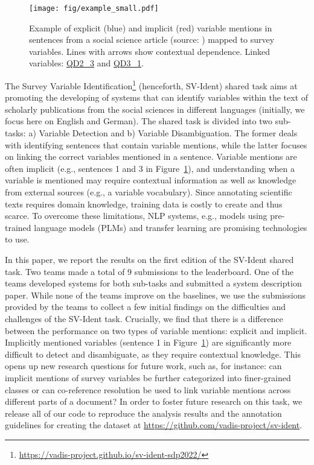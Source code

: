\documentclass[11pt]{article}
\begin{document}
\begin{figure}
    \centering
    \texttt{[image: fig/example\_small.pdf]}
    \caption{Example of {\color[HTML]{0072B2}explicit} ({\color[HTML]{0072B2}blue}) and {\color[HTML]{D35F00}implicit} ({\color[HTML]{D35F00}red}) variable mentions in sentences from a social science article (source:  \citet{MaC885}) mapped to survey variables. Lines with arrows show contextual dependence. Linked variables: \href{https://search.gesis.org/variables/exploredata-ZA5876_Varqd2_3}{QD2\_3} and \href{https://search.gesis.org/variables/exploredata-ZA5876_Varqd3_1}{QD3\_1}.}
    \label{fig:example}
\end{figure}

The Survey Variable Identification\footnote{\url{https://vadis-project.github.io/sv-ident-sdp2022/}} (henceforth, SV-Ident) shared task aims at promoting the developing of systems that can identify variables within the text of scholarly publications from the social sciences in different languages (initially, we focus here on English and German).
The shared task is divided into two sub-tasks: a) Variable Detection and b) Variable Disambiguation.
The former deals with identifying sentences that contain variable mentions, while the latter focuses on linking the correct variables mentioned in a sentence.
Variable mentions are often implicit (e.g., sentences 1 and 3 in Figure~\ref{fig:example}), and understanding when a variable is mentioned may require contextual information as well as knowledge from external sources (e.g., a variable vocabulary).
Since annotating scientific texts requires domain knowledge, training data is costly to create and thus scarce.
To overcome these limitations, NLP systems, e.g., models using pre-trained language models (PLMs) and transfer learning are promising technologies to use.

In this paper, we report the results on the first edition of the SV-Ident shared task.
Two teams made a total of 9 submissions to the leaderboard.
One of the teams developed systems for both sub-tasks and submitted a system description paper.
While none of the teams improve on the baselines, we use the submissions provided by the teams to collect a few initial findings on the difficulties and challenges of the SV-Ident task.
Crucially, we find that there is a difference between the performance on two types of variable mentions: explicit and implicit.
Implicitly mentioned variables (sentence 1 in Figure~\ref{fig:example}) are significantly more difficult to detect and disambiguate, as they require contextual knowledge.
This opens up new research questions for future work, such as, for instance: can implicit mentions of survey variables be further categorized into finer-grained classes or can co-reference resolution be used to link variable mentions across different parts of a document?
In order to foster future research on this task, we release all of our code to reproduce the analysis results and the annotation guidelines for creating the dataset at \url{https://github.com/vadis-project/sv-ident}.
\end{document}
